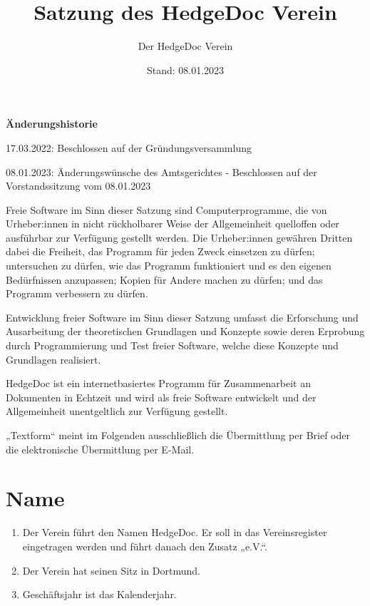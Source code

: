 \documentclass[12pt,paper=a4,ngerman]{scrreprt}
\author{Der HedgeDoc Verein}
\title{Satzung des HedgeDoc Verein}
\date{Stand: 08.01.2023}
\begin{document}
	\maketitle
	\newpage
	
	\textbf{Änderungshistorie}
	\begin{description}
		\item
			17.03.2022: Beschlossen auf der Gründungsversammlung
		\item
			08.01.2023: Änderungswünsche des Amtsgerichtes - Beschlossen auf der Vorstandssitzung vom 08.01.2023
	\end{description}
	\newpage
	
	\tableofcontents
	\newpage
	
        Freie Software im Sinn dieser Satzung sind Computerprogramme, die von Urheber:innen in nicht rückholbarer Weise der Allgemeinheit quelloffen oder ausführbar zur Verfügung gestellt werden. Die Urheber:innen gewähren Dritten dabei die Freiheit, das Programm für jeden Zweck einsetzen zu dürfen; untersuchen zu dürfen, wie das Programm funktioniert und es den eigenen Bedürfnissen anzupassen; Kopien für Andere machen zu dürfen; und das Programm verbessern zu dürfen.
        
        Entwicklung freier Software im Sinn dieser Satzung umfasst die Erforschung und Ausarbeitung der theoretischen Grundlagen und Konzepte sowie deren Erprobung durch Programmierung und Test freier Software, welche diese Konzepte und Grundlagen realisiert.
        
        HedgeDoc ist ein internetbasiertes Programm für Zusammenarbeit an Dokumenten in Echtzeit und wird als freie Software entwickelt und der Allgemeinheit unentgeltlich zur Verfügung gestellt.
        
        „Textform“ meint im Folgenden ausschließlich die Übermittlung per Brief oder die elektronische Übermittlung per E-Mail.
    
	\section{Name}
	\begin{enumerate}
		\item
			Der Verein führt den Namen HedgeDoc. Er soll in das Vereinsregister eingetragen werden und führt danach den Zusatz „e.V.“.
		\item
			Der Verein hat seinen Sitz in Dortmund.
		\item
			Geschäftsjahr ist das Kalenderjahr.
	\end{enumerate}
	
\end{document}
